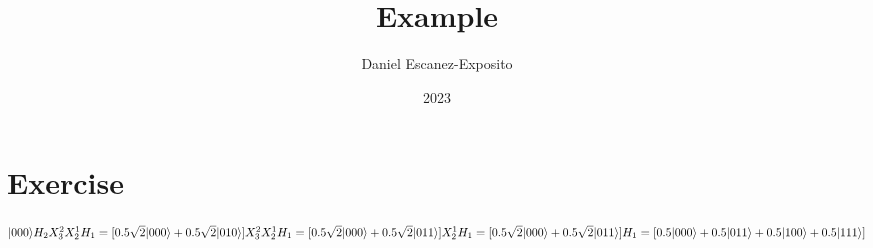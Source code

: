 \documentclass{article}
\title{Example}
\author{Daniel Escanez-Exposito}
\date{2023}
\begin{document}
    \maketitle

    \section{Exercise}
    $
     |000\rangle H_{2}X_{3}^{2}X_{2}^{1}H_{1}\\ \\ 
= [0.5 \sqrt{2} |000\rangle +0.5 \sqrt{2} |010\rangle ]X_{3}^{2}X_{2}^{1}H_{1}\\ \\ 
= [0.5 \sqrt{2} |000\rangle +0.5 \sqrt{2} |011\rangle ]X_{2}^{1}H_{1}\\ \\ 
= [0.5 \sqrt{2} |000\rangle +0.5 \sqrt{2} |011\rangle ]H_{1}\\ \\ 
= [0.5 |000\rangle +0.5 |011\rangle +0.5 |100\rangle +0.5 |111\rangle ]\\ 
    $
    
\end{document}
